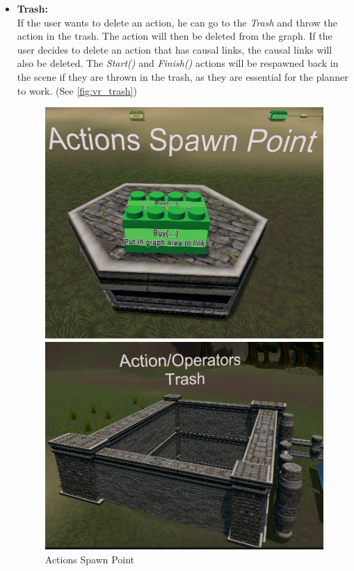 \begin{itemize}
    \item \textbf{Trash:} \\
          If the user wants to delete an action, he can go to the \textit{Trash} and throw the action in the trash. The action will then be deleted from the graph. If the user decides to delete an action that has causal links, the causal links will also be deleted. The \textit{Start()} and \textit{Finish()} actions will be respawned back in the scene if they are thrown in the trash, as they are essential for the planner to work. (See \autoref{fig:vr_trash})
          \begin{figure}[h]
              \centering
              \begin{minipage}{0.4\textwidth}
                  \centering
                  \includegraphics[width=\textwidth]{images/actions_spawn.png}
                  \caption[Actions Spawn Point in VR]{Actions Spawn Point}
                  \label{fig:vr_actions_spawn_point}
              \end{minipage}\hfill
              \begin{minipage}{0.4\textwidth}
                  \centering
                  \includegraphics[width=\textwidth]{images/trash.png}

\end{minipage}
\end{figure}
\end{itemize}
